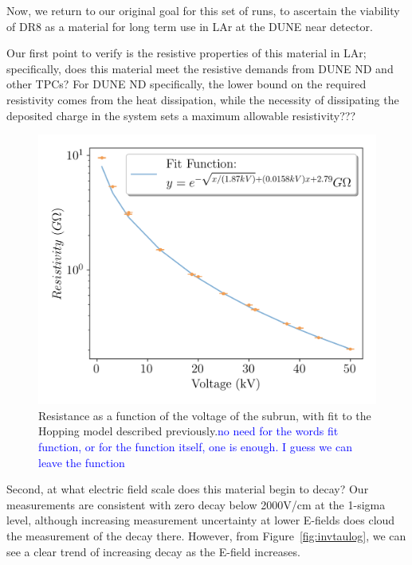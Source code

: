 \documentclass[a4paper,12pt]{article}
\newcommand{\RI}[1]{\textcolor{blue}{#1}}
\begin{document}
\label{sec:long_term_results}
Now, we return to our original goal for this set of runs, to ascertain the viability of DR8 as a material for long term use in LAr at the DUNE near detector. 

Our first point to verify is the resistive properties of this material in LAr; specifically, does this material meet the resistive demands from DUNE ND and other TPCs? For DUNE ND specifically, the lower bound on the required resistivity comes from the heat dissipation, while the necessity of dissipating the deposited charge in the system sets a maximum allowable resistivity???

\begin{figure}
	\begin{center}
		
		\includegraphics[width=0.75\linewidth]{Efield_Z.png}
		\caption{Resistance as a function of the voltage of the subrun, with fit to the Hopping model described previously.\RI{no need for the words fit function, or for the function itself, one is enough. I guess we can leave the function}} 
		\label{fig:resvsvol}
	\end{center}
\end{figure}


Second, at what electric field scale does this material begin to decay? Our measurements are consistent with zero decay below 2000V/cm at the 1-sigma level, although increasing measurement uncertainty at lower E-fields does cloud the measurement of the decay there. However, from Figure~\ref{fig:invtaulog}, we can see a clear trend of increasing decay as the E-field increases.


\end{document}
